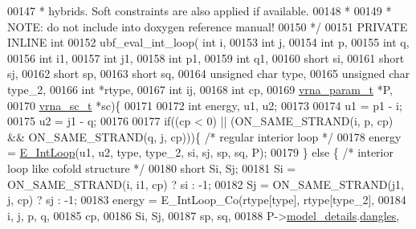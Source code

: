 \begin{DoxyCode}
00147 \textcolor{comment}{ *  hybrids. Soft constraints are also applied if available.}
00148 \textcolor{comment}{ *}
00149 \textcolor{comment}{ *  NOTE: do not include into doxygen reference manual!}
00150 \textcolor{comment}{ */}
00151 PRIVATE INLINE \textcolor{keywordtype}{int}
00152 ubf\_eval\_int\_loop(  \textcolor{keywordtype}{int} i,
00153                     \textcolor{keywordtype}{int} j,
00154                     \textcolor{keywordtype}{int} p,
00155                     \textcolor{keywordtype}{int} q,
00156                     \textcolor{keywordtype}{int} i1,
00157                     \textcolor{keywordtype}{int} j1,
00158                     \textcolor{keywordtype}{int} p1,
00159                     \textcolor{keywordtype}{int} q1,
00160                     \textcolor{keywordtype}{short} si,
00161                     \textcolor{keywordtype}{short} sj,
00162                     \textcolor{keywordtype}{short} sp,
00163                     \textcolor{keywordtype}{short} sq,
00164                     \textcolor{keywordtype}{unsigned} \textcolor{keywordtype}{char} type,
00165                     \textcolor{keywordtype}{unsigned} \textcolor{keywordtype}{char} type\_2,
00166                     \textcolor{keywordtype}{int} *rtype,
00167                     \textcolor{keywordtype}{int} ij,
00168                     \textcolor{keywordtype}{int} cp,
00169                     \hyperlink{group__energy__parameters_structvrna__param__s}{vrna\_param\_t} *P,
00170                     \hyperlink{group__soft__constraints_structvrna__sc__s}{vrna\_sc\_t} *sc)\{
00171 
00172   \textcolor{keywordtype}{int} energy, u1, u2;
00173 
00174   u1 = p1 - i;
00175   u2 = j1 - q;
00176 
00177   \textcolor{keywordflow}{if}((cp < 0) || (ON\_SAME\_STRAND(i, p, cp) && ON\_SAME\_STRAND(q, j, cp)))\{ \textcolor{comment}{/* regular interior loop */}
00178     energy = \hyperlink{group__loops_ga0266d2c7a6098259280fb97e9f980b34}{E\_IntLoop}(u1, u2, type, type\_2, si, sj, sp, sq, P);
00179   \} \textcolor{keywordflow}{else} \{ \textcolor{comment}{/* interior loop like cofold structure */}
00180     \textcolor{keywordtype}{short} Si, Sj;
00181     Si  = ON\_SAME\_STRAND(i, i1, cp) ? si : -1;
00182     Sj  = ON\_SAME\_STRAND(j1, j, cp) ? sj : -1;
00183     energy = E\_IntLoop\_Co(rtype[type], rtype[type\_2],
00184                             i, j, p, q,
00185                             cp,
00186                             Si, Sj,
00187                             sp, sq,
00188                             P->\hyperlink{group__energy__parameters_a7b84353eb9075c595bad4ceb871bcae7}{model\_details}.\hyperlink{group__model__details_adcda4ff2ea77748ae0e8700288282efc}{dangles},

\end{DoxyCode}
